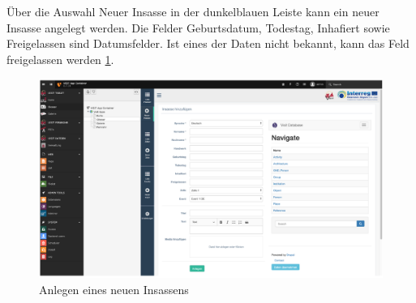 Über die Auswahl \glqq Neuer Insasse\grqq{} in der dunkelblauen Leiste kann ein neuer Insasse angelegt werden. Die Felder Geburtsdatum, Todestag, Inhafiert sowie Freigelassen sind Datumsfelder. Ist eines der Daten nicht bekannt, kann das Feld freigelassen werden
\ref{img:anlegen_insassen}.
\begin{figure}[ht!]
\centering
\includegraphics[width=12cm]{Figures/paula/glossar/anlegen_insassen.png}
\caption{Anlegen eines neuen Insassens}
\label{img:anlegen_insassen}
\end{figure}

